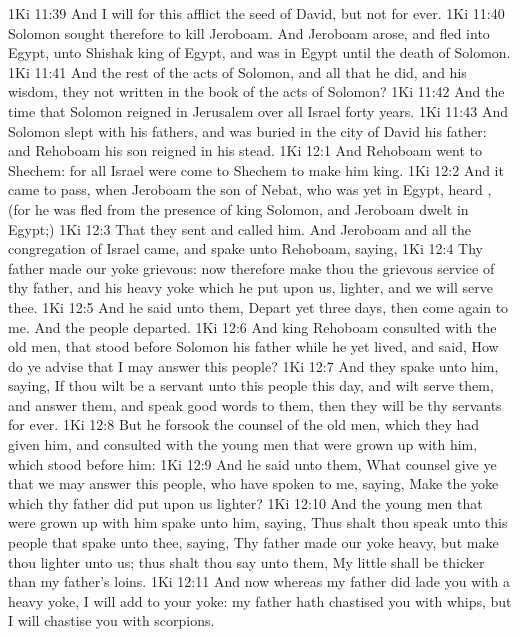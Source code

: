 \vs 1Ki 11:39 And I will for this afflict the seed of David, but not for ever.
\vs 1Ki 11:40 Solomon sought therefore to kill Jeroboam. And Jeroboam arose, and fled into Egypt, unto Shishak king of Egypt, and was in Egypt until the death of Solomon.
\vs 1Ki 11:41 And the rest of the acts of Solomon, and all that he did, and his wisdom,  they not written in the book of the acts of Solomon?
\vs 1Ki 11:42 And the time that Solomon reigned in Jerusalem over all Israel  forty years.
\vs 1Ki 11:43 And Solomon slept with his fathers, and was buried in the city of David his father: and Rehoboam his son reigned in his stead.
\vs 1Ki 12:1 And Rehoboam went to Shechem: for all Israel were come to Shechem to make him king.
\vs 1Ki 12:2 And it came to pass, when Jeroboam the son of Nebat, who was yet in Egypt, heard , (for he was fled from the presence of king Solomon, and Jeroboam dwelt in Egypt;)
\vs 1Ki 12:3 That they sent and called him. And Jeroboam and all the congregation of Israel came, and spake unto Rehoboam, saying,
\vs 1Ki 12:4 Thy father made our yoke grievous: now therefore make thou the grievous service of thy father, and his heavy yoke which he put upon us, lighter, and we will serve thee.
\vs 1Ki 12:5 And he said unto them, Depart yet  three days, then come again to me. And the people departed.
\vs 1Ki 12:6 And king Rehoboam consulted with the old men, that stood before Solomon his father while he yet lived, and said, How do ye advise that I may answer this people?
\vs 1Ki 12:7 And they spake unto him, saying, If thou wilt be a servant unto this people this day, and wilt serve them, and answer them, and speak good words to them, then they will be thy servants for ever.
\vs 1Ki 12:8 But he forsook the counsel of the old men, which they had given him, and consulted with the young men that were grown up with him,  which stood before him:
\vs 1Ki 12:9 And he said unto them, What counsel give ye that we may answer this people, who have spoken to me, saying, Make the yoke which thy father did put upon us lighter?
\vs 1Ki 12:10 And the young men that were grown up with him spake unto him, saying, Thus shalt thou speak unto this people that spake unto thee, saying, Thy father made our yoke heavy, but make thou  lighter unto us; thus shalt thou say unto them, My little  shall be thicker than my father's loins.
\vs 1Ki 12:11 And now whereas my father did lade you with a heavy yoke, I will add to your yoke: my father hath chastised you with whips, but I will chastise you with scorpions.

